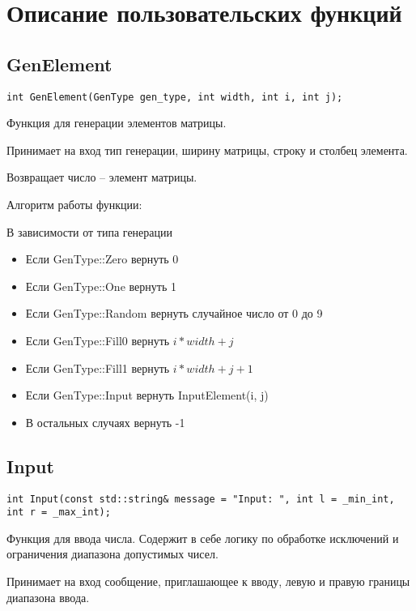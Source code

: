 \section*{Описание пользовательских функций}

\subsection*{GenElement}

\begin{lstlisting}[label={lst:GenElement}]
	int GenElement(GenType gen_type, int width, int i, int j);
\end{lstlisting}

Функция для генерации элементов матрицы.

Принимает на вход тип генерации, ширину матрицы,
строку и столбец элемента.

Возвращает число -- элемент матрицы.

Алгоритм работы функции:

В зависимости от типа генерации
\begin{itemize}
	\item Если GenType::Zero вернуть 0
	\item Если GenType::One вернуть 1
	\item Если GenType::Random вернуть случайное число от 0 до 9
	\item Если GenType::Fill0 вернуть $ i*width+j $
	\item Если GenType::Fill1 вернуть $ i*width+j+1 $
	\item Если GenType::Input вернуть InputElement(i, j)
	\item В остальных случаях вернуть -1
\end{itemize}

\subsection*{Input}

\begin{lstlisting}[label={lst:Input}]
	int Input(const std::string& message = "Input: ", int l = _min_int, int r = _max_int);
\end{lstlisting}

Функция для ввода числа.
Содержит в себе логику по обработке исключений и
ограничения диапазона допустимых чисел.

Принимает на вход сообщение, приглашающее к вводу,
левую и правую границы диапазона ввода.

